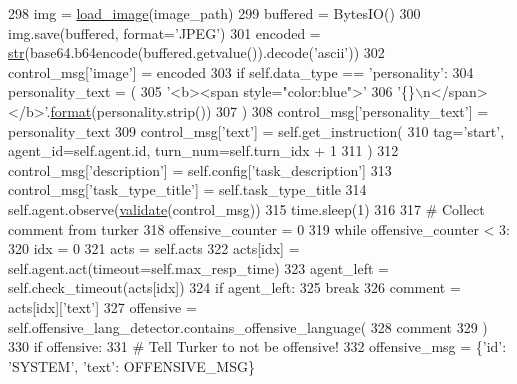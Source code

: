 \begin{DoxyCode}
298                 img = \hyperlink{namespacepersonality__captions_1_1worlds_a2863737d97a8e8c5a1ebe9029d0d2293}{load\_image}(image\_path)
299             buffered = BytesIO()
300             img.save(buffered, format=\textcolor{stringliteral}{'JPEG'})
301             encoded = \hyperlink{namespacegenerate__task__READMEs_a5b88452ffb87b78c8c85ececebafc09f}{str}(base64.b64encode(buffered.getvalue()).decode(\textcolor{stringliteral}{'ascii'}))
302             control\_msg[\textcolor{stringliteral}{'image'}] = encoded
303             \textcolor{keywordflow}{if} self.data\_type == \textcolor{stringliteral}{'personality'}:
304                 personality\_text = (
305                     \textcolor{stringliteral}{'<b><span style="color:blue">'}
306                     \textcolor{stringliteral}{'\{\}\(\backslash\)n</span></b>'}.\hyperlink{namespaceparlai_1_1chat__service_1_1services_1_1messenger_1_1shared__utils_a32e2e2022b824fbaf80c747160b52a76}{format}(personality.strip())
307                 )
308                 control\_msg[\textcolor{stringliteral}{'personality\_text'}] = personality\_text
309             control\_msg[\textcolor{stringliteral}{'text'}] = self.get\_instruction(
310                 tag=\textcolor{stringliteral}{'start'}, agent\_id=self.agent.id, turn\_num=self.turn\_idx + 1
311             )
312             control\_msg[\textcolor{stringliteral}{'description'}] = self.config[\textcolor{stringliteral}{'task\_description'}]
313             control\_msg[\textcolor{stringliteral}{'task\_type\_title'}] = self.task\_type\_title
314             self.agent.observe(\hyperlink{namespaceparlai_1_1core_1_1worlds_afc3fad603b7bce41dbdc9cdc04a9c794}{validate}(control\_msg))
315             time.sleep(1)
316 
317             \textcolor{comment}{# Collect comment from turker}
318             offensive\_counter = 0
319             \textcolor{keywordflow}{while} offensive\_counter < 3:
320                 idx = 0
321                 acts = self.acts
322                 acts[idx] = self.agent.act(timeout=self.max\_resp\_time)
323                 agent\_left = self.check\_timeout(acts[idx])
324                 \textcolor{keywordflow}{if} agent\_left:
325                     \textcolor{keywordflow}{break}
326                 comment = acts[idx][\textcolor{stringliteral}{'text'}]
327                 offensive = self.offensive\_lang\_detector.contains\_offensive\_language(
328                     comment
329                 )
330                 \textcolor{keywordflow}{if} offensive:
331                     \textcolor{comment}{# Tell Turker to not be offensive!}
332                     offensive\_msg = \{\textcolor{stringliteral}{'id'}: \textcolor{stringliteral}{'SYSTEM'}, \textcolor{stringliteral}{'text'}: OFFENSIVE\_MSG\}

\end{DoxyCode}
